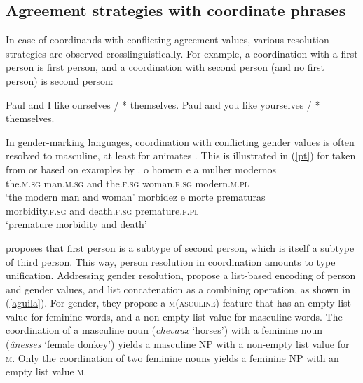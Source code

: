 \subsection{Agreement strategies with coordinate phrases}
\label{coordination:sec-agreement-with-coordinate-phrases}

In case of coordinands with conflicting agreement values, various resolution strategies are observed 
crosslinguistically. For example, a coordination with a first person is first person, and a coordination with second person (and no first person) is second person:

\eal
\ex Paul and I like ourselves / * themselves.
\ex Paul and you like yourselves / * themselves.
\zl

In gender-marking languages, coordination with conflicting gender values is often resolved to 
masculine, at least for animates \citep[186]{Corbet91}. This is illustrated in (\ref{pt}) for  taken from or based on examples by \citet*{Villavicencio:Sadler:ea:05}.
\eal
\label{pt}
\ex 
\gll o homem e a mulher modernos\footnotemark\\
     the.\textsc{m.sg} man.\textsc{m.sg} and the.\textsc{f.sg} woman.\textsc{f.sg} modern.\textsc{m.pl} \\
\glt `the modern man and woman'
\ex 
\gll morbidez e morte prematuras\footnotemark\\
     morbidity.\textsc{f.sg} and death.\textsc{f.sg} premature.\textsc{f.pl}\\
\glt `premature morbidity and death'\\
\zl


\citet[]{Sag:03} proposes that first person is a subtype of second person, which is itself a subtype of third person. This way, person resolution in coordination amounts to type unification. Addressing gender resolution, \citet{Aguila:Crysmann:18} propose a list-based encoding of person and gender values, and list concatenation as a combining operation, as shown in (\ref{aguila}). For gender, they propose a \textsc{m}(\textsc{asculine}) feature that has an empty list value for feminine words, and a non-empty list value for masculine words.  The coordination of a masculine noun (\emph{chevaux} `horses') with a feminine noun (\emph{\^{a}nesses} `female donkey')  yields a masculine NP with a non-empty list value for \textsc{m}. Only the coordination of two feminine nouns yields a feminine NP with an empty list value \textsc{m}.
 
